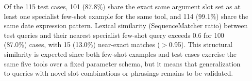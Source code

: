 Of the 115 test cases, 101 (87.8\%) share the exact same argument slot set as at least one specialist few-shot example for the same tool, and 114 (99.1\%) share the same date expression pattern. Lexical similarity (SequenceMatcher ratio) between test queries and their nearest specialist few-shot query exceeds 0.6 for 100 (87.0\%) cases, with 15 (13.0\%) near-exact matches ($>$0.95). This structural similarity is expected since both few-shot examples and test cases exercise the same five tools over a fixed parameter schema, but it means that generalization to queries with novel slot combinations or phrasings remains to be validated.